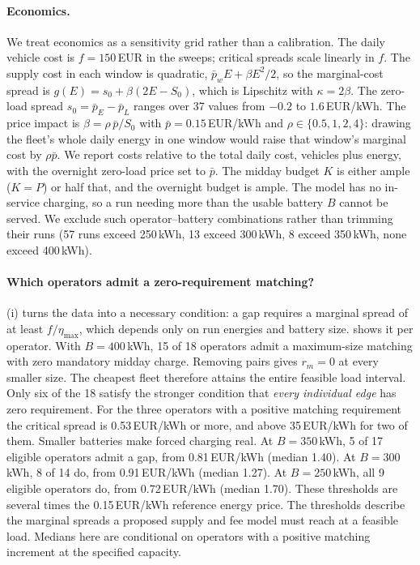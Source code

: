 \documentclass[11pt]{article}
\theoremstyle{definition}\newtheorem{definition}[theorem]{Definition}
\theoremstyle{remark}\newtheorem{remark}[theorem]{Remark}
\begin{document}
\paragraph{Economics.} We treat economics as a sensitivity grid rather than a
calibration. The daily vehicle cost is $f=150$\,EUR in the sweeps; critical
spreads scale linearly in $f$. The supply cost in each window is quadratic,
$\bar p_wE+\beta E^2/2$, so the marginal-cost spread is
$g(E)=s_0+\beta(2E-S_0)$, which is Lipschitz with $\kappa=2\beta$. The zero-load
spread $s_0=\bar p_E-\bar p_L$ ranges over 37 values from $-0.2$ to
$1.6$\,EUR/kWh. The price impact is $\beta=\rho\,\bar p/S_0$ with $\bar p=0.15$\,EUR/kWh
and $\rho\in\{0.5,1,2,4\}$: drawing the fleet's whole daily energy in one window
would raise that window's marginal cost by $\rho\bar p$. We report costs relative
to the total daily cost, vehicles plus energy, with the overnight zero-load price
set to $\bar p$. The midday budget $K$ is either ample ($K=P$) or half that, and
the overnight budget is ample. The model has no in-service charging, so a run
needing more than the usable battery $B$ cannot be served. We exclude such
operator--battery combinations rather than trimming their runs (57 runs exceed
250\,kWh, 13 exceed 300\,kWh, 8 exceed 350\,kWh, none exceed 400\,kWh).

\paragraph{Which operators admit a zero-requirement matching?}
(i) turns the data into a necessary condition: a gap requires
a marginal spread of at least $f/\eta_{\max}$, which depends only on run energies
and battery size.  shows it per operator. With $B=400$\,kWh,
15 of 18 operators admit a maximum-size matching with zero mandatory midday
charge. Removing pairs gives $r_m=0$ at every smaller size. The cheapest
fleet therefore attains the entire feasible load interval. Only six of the
18 satisfy the stronger condition that \emph{every individual edge} has zero
requirement. For the three operators with a positive matching requirement the critical spread is
0.53\,EUR/kWh or more, and above 35\,EUR/kWh for two of them. Smaller batteries
make forced charging real. At $B=350$\,kWh, 5 of 17 eligible operators admit a gap,
from 0.81\,EUR/kWh (median 1.40). At $B=300$\,kWh, 8 of 14 do, from 0.91\,EUR/kWh
(median 1.27). At $B=250$\,kWh, all 9 eligible operators do, from 0.72\,EUR/kWh
(median 1.70). These thresholds are several times the 0.15\,EUR/kWh reference
energy price. The thresholds describe the marginal spreads a proposed supply
and fee model must reach at a feasible load. Medians here are conditional
on operators with a positive matching increment at the specified capacity.
\end{document}
